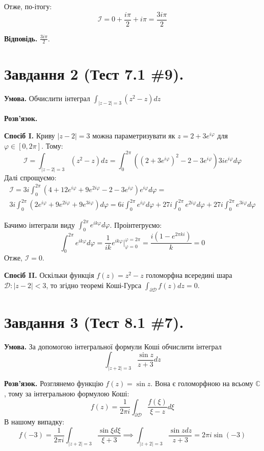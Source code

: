 \documentclass[14pt]{extarticle}
\begin{document}
Отже, по-ітогу:
\[
\mathcal{I} = 0 + \frac{i\pi}{2} + i\pi = \frac{3i\pi}{2}
\]

\textbf{Відповідь.} $\frac{3i\pi}{2}$.

\section*{Завдання 2 (Тест 7.1 \#9).}

\textbf{Умова.} Обчислити інтеграл $\int_{|z-2|=3}(z^2-z)dz$

\textbf{Розв'язок.} 

\textbf{Спосіб I.} Криву $|z-2|=3$ можна параметризувати як $z = 2 + 3e^{i\varphi}$ для $\varphi \in [0,2\pi]$. Тому:
\[
\mathcal{I}=\int_{|z-2|=3}(z^2-z)dz = \int_0^{2\pi} ((2+3e^{i\varphi})^2 - 2 - 3e^{i\varphi})3ie^{i\varphi}d\varphi
\]
Далі спрощуємо:
\begin{gather*}
\mathcal{I} = 3i\int_0^{2\pi}(4+12e^{i\varphi}+9e^{2i\varphi} - 2 - 3e^{i\varphi})e^{i\varphi}d\varphi = \\
3i\int_0^{2\pi} (2e^{i\varphi} + 9e^{2i\varphi} + 9e^{3i\varphi})d\varphi = 6i\int_0^{2\pi}e^{i\varphi}d\varphi + 27i\int_0^{2\pi}e^{2i\varphi}d\varphi + 27i\int_0^{2\pi}e^{3i\varphi}d\varphi
\end{gather*}

Бачимо інтеграли виду $\int_0^{2\pi}e^{i k\varphi}d\varphi$. Проінтегруємо:
\[
\int_0^{2\pi} e^{ik\varphi}d\varphi = \frac{1}{ik} e^{ik\varphi}\Big|_{\varphi=0}^{\varphi=2\pi} = \frac{i(1 - e^{2\pi ki})}{k} = 0
\]
Отже, $\mathcal{I} = 0$. 

\textbf{Спосіб II.} Оскільки функція $f(z)=z^2-z$ голоморфна всередині шара $\mathcal{D}:|z-2|<3$, то згідно теоремі Коші-Гурса $\int_{\partial\mathcal{D}}f(z)dz=0$. 

\section*{Завдання 3 (Тест 8.1 \#7).}
\textbf{Умова.} За допомогою інтегральної формули Коші обчислити інтеграл 
\[
\int_{|z+2|=3} \frac{\sin z}{z+3}dz
\]

\textbf{Розв'язок.} Розглянемо функцію $f(z)=\sin z$. Вона є голоморфною на всьому $\mathbb{C}$, тому за інтегральною формулою Коші:
\[
f(z) = \frac{1}{2\pi i}\int_{\partial\mathcal{D}} \frac{f(\xi)}{\xi - z}d\xi
\]
В нашому випадку:
\[
f(-3) = \frac{1}{2\pi i}\int_{|z+2|=3} \frac{\sin \xi d\xi}{\xi+3} \implies \int_{|z+2|=3} \frac{\sin zdz}{z+3} = 2\pi i \sin(-3)
\]
\end{document}
